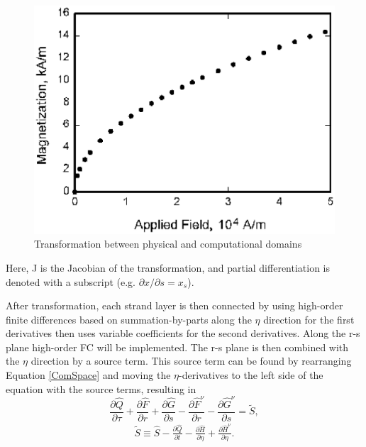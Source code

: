 \documentclass[draft]{aiaa-pretty}
\begin{document}
 \begin{figure}
  \centering
  \includegraphics[scale=.5]{figure_magnet.eps}
  \caption{Transformation between physical and computational domains \label{CompDom}}
 \end{figure}
 Here, J is the Jacobian of the transformation, and partial differentiation is denoted with a subscript (e.g. $\partial x/\partial s = x_s$).  
 
 After transformation,
 each strand layer is then connected by using high-order finite differences based on summation-by-parts along the $\eta$ direction for the first derivatives then uses 
 variable coefficients for the second derivatives. Along the r-s plane high-order FC will be implemented.  The r-s plane is then combined with the $\eta$ direction by a source term.
 This source term can be found by rearranging Equation \ref{ComSpace} and moving the $\eta$-derivatives to the left side of the equation with the source terms, resulting in
 \begin{equation}
  \frac{\partial \hat{Q}}{\partial \tau}+\frac{\partial \hat{F}}{\partial r}+\frac{\partial \hat{G}}{\partial s}
  -\frac{\partial \hat{F}^\nu}{\partial r}-\frac{\partial \hat{G}^\nu}{\partial s}=\tilde{S},\label{Simple}
 \end{equation}
 \begin{gather*}
  \tilde{S} \equiv \hat{S} - \frac{\partial \hat{Q}}{\partial t} - \frac{\partial \hat{H}}{\partial \eta} + \frac{\partial \hat{H}^\nu}{\partial \eta}. 
 \end{gather*}
 
\end{document}
